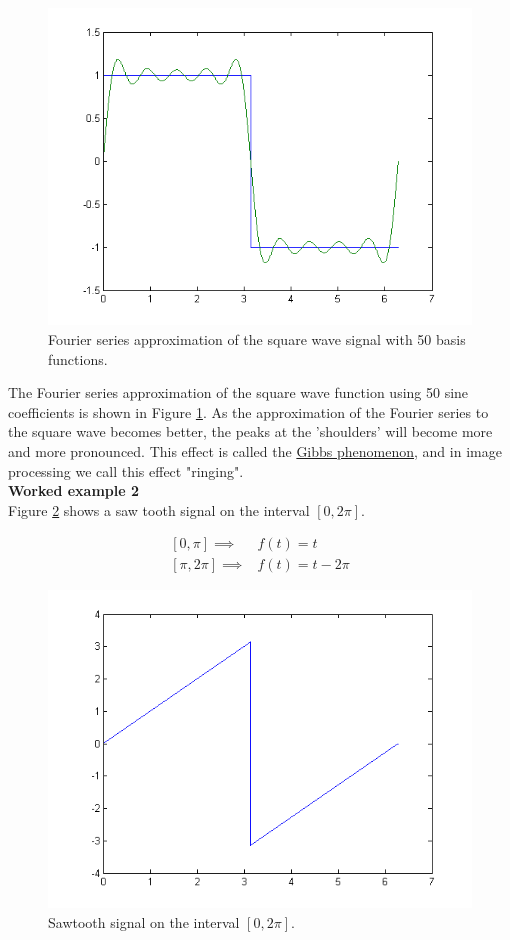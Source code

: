 \documentclass[11pt,letterpaper]{article}
\begin{document}
\begin{figure}
\centering
\includegraphics[width=0.7\linewidth]{HW_FourierSeries3}
\caption{Fourier series approximation of the square wave signal with 50 basis functions.}
\label{fig:HW_FourierSeries3}
\end{figure}

The Fourier series approximation of the square wave function using 50 sine coefficients is shown in Figure \ref{fig:HW_FourierSeries3}. As the approximation of the Fourier series to the square wave becomes better, the peaks at the 'shoulders' will become more and more pronounced. This effect is called the \href{http://en.wikipedia.org/wiki/Gibbs_phenomenon}{Gibbs phenomenon}, and in image processing we call this effect "ringing".\\ 

\textbf{Worked example 2}\\

Figure \ref{fig:HW_FourierSeries4} shows a saw tooth signal on the interval $[0, 2 \pi]$.

\begin{equation} \label{Eqn:HW_FourierSeries7}
\begin{split}
[0,  \pi] \implies &f(t) = t\\
[\pi,  2\pi] \implies &f(t) = t- 2 \pi
\end{split}
\end{equation}

\begin{figure}
\centering
\includegraphics[width=0.7\linewidth]{HW_FourierSeries4}
\caption{Sawtooth signal on the interval $[0, 2 \pi]$.}
\label{fig:HW_FourierSeries4}
\end{figure}
\end{document}
